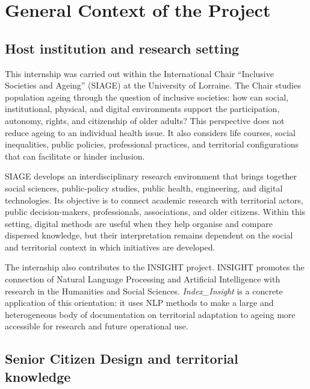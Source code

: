 
\chapter{General Context of the Project}

\section{Host institution and research setting}

This internship was carried out within the International Chair ``Inclusive
Societies and Ageing'' (SIAGE) at the University of Lorraine. The Chair studies
population ageing through the question of inclusive societies: how can social,
institutional, physical, and digital environments support the participation,
autonomy, rights, and citizenship of older adults? This perspective does not
reduce ageing to an individual health issue. It also considers life courses,
social inequalities, public policies, professional practices, and territorial
configurations that can facilitate or hinder inclusion.

SIAGE develops an interdisciplinary research environment that brings together
social sciences, public-policy studies, public health, engineering, and digital
technologies. Its objective is to connect academic research with territorial
actors, public decision-makers, professionals, associations, and older citizens.
Within this setting, digital methods are useful when they help organise and
compare dispersed knowledge, but their interpretation remains dependent on the
social and territorial context in which initiatives are developed.

The internship also contributes to the INSIGHT project. INSIGHT promotes the
connection of Natural Language Processing and Artificial Intelligence with
research in the Humanities and Social Sciences. \textit{Index\_Insight} is a
concrete application of this orientation: it uses NLP methods to make a large
and heterogeneous body of documentation on territorial adaptation to ageing more
accessible for research and future operational use.

\section{Senior Citizen Design and territorial knowledge}


